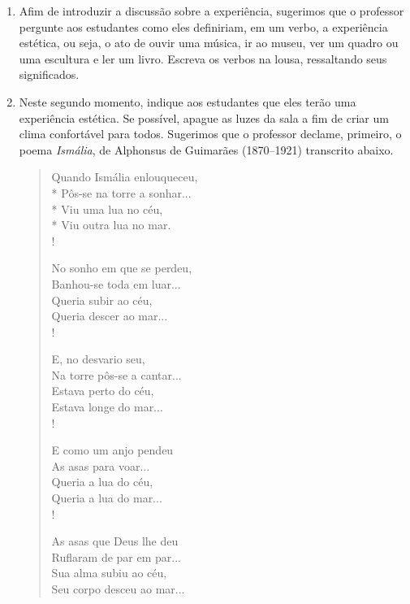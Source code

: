 \documentclass[12pt]{extarticle}
\begin{document}
\begin{enumerate}

  \item
  Afim de introduzir a discussão sobre a experiência, sugerimos
  que o professor pergunte aos estudantes como eles definiriam,
  em um verbo, a experiência estética, ou seja, o ato de ouvir uma 
  música, ir ao museu, ver um quadro ou uma escultura e ler um livro.
  Escreva os verbos na lousa, ressaltando seus significados.

  \item Neste segundo momento, indique aos estudantes que eles 
  terão uma experiência estética. Se possível, apague as luzes da
  sala a fim de criar um clima confortável para todos. Sugerimos
  que o professor declame, primeiro, o poema \textit{Ismália}, de 
  Alphonsus de Guimarães (1870--1921) transcrito abaixo.

\begin{verse}
Quando Ismália enlouqueceu,\\*
Pôs-se na torre a sonhar...\\*
Viu uma lua no céu,\\*
Viu outra lua no mar.\\!


No sonho em que se perdeu,\\
Banhou-se toda em luar...\\
Queria subir ao céu,\\
Queria descer ao mar...\\!


E, no desvario seu,\\
Na torre pôs-se a cantar...\\
Estava perto do céu,\\
Estava longe do mar...\\!


E como um anjo pendeu\\
As asas para voar...\\
Queria a lua do céu,\\
Queria a lua do mar...\\!


As asas que Deus lhe deu\\
Ruflaram de par em par...\\
Sua alma subiu ao céu,\\
Seu corpo desceu ao mar...
\end{verse}


\end{enumerate}
\end{document}
